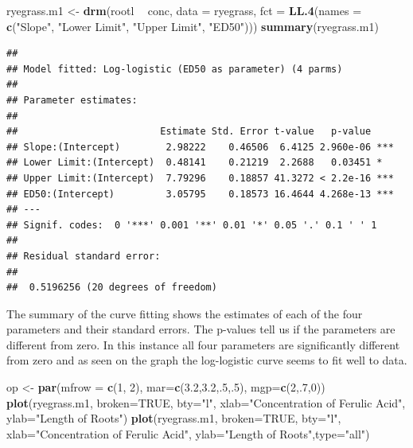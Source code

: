 \documentclass[letterpaper,]{book}
\newenvironment{Shaded}{\begin{snugshade}}{\end{snugshade}}
\newcommand{\DataTypeTok}[1]{\textcolor[rgb]{0.13,0.29,0.53}{#1}}
\newcommand{\DecValTok}[1]{\textcolor[rgb]{0.00,0.00,0.81}{#1}}
\newcommand{\FloatTok}[1]{\textcolor[rgb]{0.00,0.00,0.81}{#1}}
\newcommand{\KeywordTok}[1]{\textcolor[rgb]{0.13,0.29,0.53}{\textbf{#1}}}
\newcommand{\NormalTok}[1]{#1}
\newcommand{\OperatorTok}[1]{\textcolor[rgb]{0.81,0.36,0.00}{\textbf{#1}}}
\newcommand{\OtherTok}[1]{\textcolor[rgb]{0.56,0.35,0.01}{#1}}
\newcommand{\StringTok}[1]{\textcolor[rgb]{0.31,0.60,0.02}{#1}}
\begin{document}
\begin{Shaded}
\begin{Highlighting}[]
\NormalTok{ryegrass.m1 <-}\StringTok{ }\KeywordTok{drm}\NormalTok{(rootl }\OperatorTok{~}\StringTok{ }\NormalTok{conc, }\DataTypeTok{data =}\NormalTok{ ryegrass, }
                   \DataTypeTok{fct =} \KeywordTok{LL.4}\NormalTok{(}\DataTypeTok{names =} \KeywordTok{c}\NormalTok{(}\StringTok{"Slope"}\NormalTok{, }\StringTok{"Lower Limit"}\NormalTok{, }\StringTok{"Upper Limit"}\NormalTok{, }\StringTok{"ED50"}\NormalTok{)))}
\KeywordTok{summary}\NormalTok{(ryegrass.m1)}
\end{Highlighting}
\end{Shaded}

\begin{verbatim}
## 
## Model fitted: Log-logistic (ED50 as parameter) (4 parms)
## 
## Parameter estimates:
## 
##                         Estimate Std. Error t-value   p-value    
## Slope:(Intercept)        2.98222    0.46506  6.4125 2.960e-06 ***
## Lower Limit:(Intercept)  0.48141    0.21219  2.2688   0.03451 *  
## Upper Limit:(Intercept)  7.79296    0.18857 41.3272 < 2.2e-16 ***
## ED50:(Intercept)         3.05795    0.18573 16.4644 4.268e-13 ***
## ---
## Signif. codes:  0 '***' 0.001 '**' 0.01 '*' 0.05 '.' 0.1 ' ' 1
## 
## Residual standard error:
## 
##  0.5196256 (20 degrees of freedom)
\end{verbatim}

The summary of the curve fitting shows the estimates of each of the four parameters and their standard errors. The p-values tell us if the parameters are different from zero. In this instance all four parameters are significantly different from zero and as seen on the graph the log-logistic curve seems to fit well to data.



\begin{Shaded}
\begin{Highlighting}[]
\NormalTok{op <-}\StringTok{ }\KeywordTok{par}\NormalTok{(}\DataTypeTok{mfrow =} \KeywordTok{c}\NormalTok{(}\DecValTok{1}\NormalTok{, }\DecValTok{2}\NormalTok{), }\DataTypeTok{mar=}\KeywordTok{c}\NormalTok{(}\FloatTok{3.2}\NormalTok{,}\FloatTok{3.2}\NormalTok{,.}\DecValTok{5}\NormalTok{,.}\DecValTok{5}\NormalTok{), }\DataTypeTok{mgp=}\KeywordTok{c}\NormalTok{(}\DecValTok{2}\NormalTok{,.}\DecValTok{7}\NormalTok{,}\DecValTok{0}\NormalTok{))}
\KeywordTok{plot}\NormalTok{(ryegrass.m1, }\DataTypeTok{broken=}\OtherTok{TRUE}\NormalTok{, }\DataTypeTok{bty=}\StringTok{"l"}\NormalTok{,}
     \DataTypeTok{xlab=}\StringTok{"Concentration of Ferulic Acid"}\NormalTok{, }\DataTypeTok{ylab=}\StringTok{"Length of Roots"}\NormalTok{)}
\KeywordTok{plot}\NormalTok{(ryegrass.m1, }\DataTypeTok{broken=}\OtherTok{TRUE}\NormalTok{, }\DataTypeTok{bty=}\StringTok{"l"}\NormalTok{,}
     \DataTypeTok{xlab=}\StringTok{"Concentration of Ferulic Acid"}\NormalTok{, }\DataTypeTok{ylab=}\StringTok{"Length of Roots"}\NormalTok{,}\DataTypeTok{type=}\StringTok{"all"}\NormalTok{)}
\end{Highlighting}
\end{Shaded}
\end{document}
